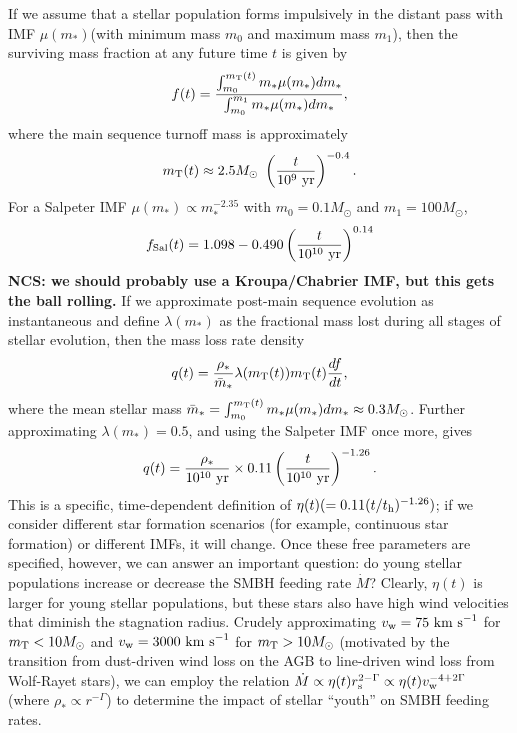 If we assume that a stellar population forms
impulsively in the distant pass with IMF $\mu(m_*)$(with minimum mass
$m_0$ and maximum mass $m_1$), then the surviving mass fraction at any
future time $t$ is given by
\begin{equation}
f(t) =\frac{ \int_{m_0}^{m_{\rm T}(t)} m_* \mu(m_*) dm_* }{ \int_{m_0}^{m_1} m_* \mu(m_*) dm_* },
\end{equation}
where the main sequence turnoff mass is approximately
\begin{equation}
m_{\rm T}(t) \approx 2.5M_\odot~ \left( \frac{t}{10^9~{\rm yr}} \right)^{-0.4}.
\end{equation}
For a Salpeter IMF $\mu(m_*) \propto m_*^{-2.35}$ with $m_0=0.1M_\odot$ and $m_1=100M_\odot$,
\begin{equation}
f_{\rm Sal}(t) = 1.098 - 0.490 \left(\frac{t}{10^{10}~{\rm yr}} \right)^{0.14}
\end{equation}
{\bf NCS: we should probably use a Kroupa/Chabrier IMF, but this gets the ball rolling.}
If we approximate post-main sequence evolution as instantaneous and define $\lambda(m_*)$ as the fractional mass lost during all stages of stellar evolution, then the mass loss rate density
\begin{equation}
q(t) = \frac{\rho_*}{\bar{m}_*} \lambda(m_{\rm T}(t)) m_{\rm T}(t) \frac{df}{dt},
\end{equation}
where the mean stellar mass $\bar{m}_* = \int_{m_0}^{m_{\rm T}(t)} m_*\mu(m_*)dm_* \approx 0.3 M_\odot$.  Further approximating $\lambda(m_*)=0.5$, and using the Salpeter IMF once more, gives
\begin{equation}
q(t) = \frac{\rho_*}{10^{10}~{\rm yr}} \times 0.11 \left(\frac{t}{10^{10}~{\rm yr}} \right)^{-1.26}.
\end{equation}
This is a specific, time-dependent definition of $\eta(t) (=0.11(t/t_{\rm h})^{-1.26})$; if we consider different star formation scenarios (for example, continuous star formation) or different IMFs, it will change.  Once these free parameters are specified, however, we can answer an important question: do young stellar populations increase or decrease the SMBH feeding rate $\dot{M}$?  Clearly, $\eta(t)$ is larger for young stellar populations, but these stars also have high wind velocities that diminish the stagnation radius.  Crudely approximating $v_{\rm w}=75~{\rm km~s}^{-1}$ for $m_{\rm T} < 10M_{\odot}$ and $v_{\rm w}=3000~{\rm km~s}^{-1}$ for $m_{\rm T} > 10M_{\odot}$ (motivated by the transition from dust-driven wind loss on the AGB to line-driven wind loss from Wolf-Rayet stars), we can employ the relation $\dot{M} \propto \eta(t) r_{\rm s}^{2-\Gamma}\propto \eta(t) v_{\rm w}^{-4+2\Gamma}$ (where $\rho_* \propto r^{-\Gamma}$) to determine the impact of stellar ``youth'' on SMBH feeding rates.
